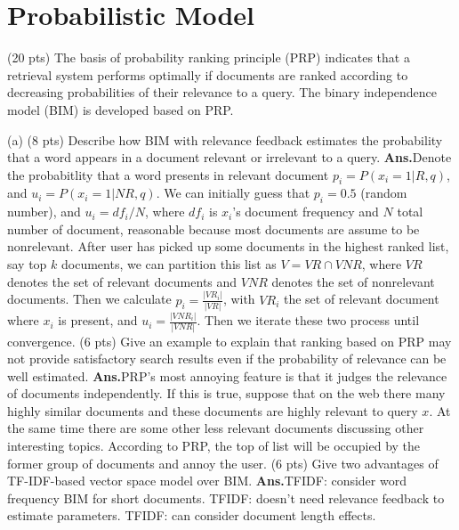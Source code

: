 \documentclass[11pt]{exam}
\newcommand{\ans}{\textbf{Ans.}}
\begin{document}
\section{Probabilistic Model}
\begin{questions}
   \question (20 pts) The basis of probability ranking principle (PRP) indicates that a retrieval system performs optimally if documents are ranked according to decreasing probabilities of their relevance to a query. The binary independence model (BIM) is developed based on PRP.
  \begin{subparts}
    \subpart (a) (8 pts) Describe how BIM with relevance feedback estimates the probability that a word appears in a document relevant or irrelevant to a query.
    \ans Denote the probabitlity that a word presents in relevant document 
    $p_i=P(x_i=1|R,q)$, and $u_i=P(x_i=1|NR, q)$. We can initially guess that $p_i=0.5$ 
   (random number), and $u_i=df_i/N$, where $df_i$ is $x_i$'s document frequency 
   and $N$ total number of document, reasonable because most documents are assume to be nonrelevant.
   After user has picked up some documents in the highest ranked list, say top $k$ 
   documents, we can partition this list as $V=VR\cap VNR$, where $VR$ denotes 
   the set of relevant documents and $VNR$ denotes the set of nonrelevant 
   documents. Then we calculate $p_i=\frac{|VR_i|}{|VR|}$, with $VR_i$ the set 
   of relevant document where $x_i$ is present, and $u_i=\frac{|VNR_i|}{|VNR|}$. 
   Then we iterate these two process until convergence.
   \subpart (6 pts) Give an example to explain that ranking based on PRP may not provide satisfactory search results even if the probability of relevance can be well estimated.
  \ans PRP's most annoying feature is that it judges the relevance of documents
  independently.  If this is true, suppose that on the web there many highly similar 
  documents and these documents are highly relevant to query $x$. At the same 
  time there are some other less relevant documents discussing other interesting 
  topics. According to PRP, the top of list will be occupied by the former group 
  of documents and annoy the user.
  \subpart (6 pts) Give two advantages of TF-IDF-based vector space model over BIM.
\ans TFIDF: consider word frequency BIM for short documents.
        TFIDF: doesn't need relevance feedback to estimate parameters.
        TFIDF: can consider document length effects.
  \end{subparts}
\end{questions}
\end{document}
